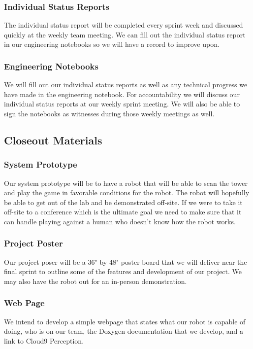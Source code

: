 \subsubsection{Individual Status Reports}
The individual status report will be completed every sprint week and discussed quickly at the weekly team meeting. We can fill out the individual status report in our engineering notebooks so we will have a record to improve upon.

\subsubsection{Engineering Notebooks}
We will fill out our individual status reports as well as any technical progress we have made in the engineering notebook. For accountability we will discuss our individual status reports at our weekly sprint meeting. We will also be able to sign the notebooks as witnesses during those weekly meetings as well.

\subsection{Closeout Materials}

\subsubsection{System Prototype}
Our system prototype will be to have a robot that will be able to scan the tower and play the game in favorable conditions for the robot. The robot will hopefully be able to get out of the lab and be demonstrated off-site. If we were to take it off-site to a conference which is the ultimate goal we need to make sure that it can handle playing against a human who doesn't know how the robot works.

\subsubsection{Project Poster}
Our project poser will be a 36" by 48" poster board that we will deliver near the final sprint to outline some of the features and development of our project. We may also have the robot out for an in-person demonstration.

\subsubsection{Web Page}
We intend to develop a simple webpage that states what our robot is capable of doing, who is on our team, the Doxygen documentation that we develop, and a link to Cloud9 Perception.

